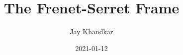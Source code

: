 \documentclass{article}
\title{The Frenet-Serret Frame}
\date{2021-01-12}
\author{Jay Khandkar}
\begin{document}
	\maketitle
	\newpage
	\tableofcontents
	\newpage
	
	\newcommand{\vect}[1]{\mathbf{#1}}
	\newcommand{\Mod}[1]{\lvert #1 \rvert}
	\newcommand{\ModFrac}[2]{\displaystyle\left\lvert \frac{#1}{#2} \right\rvert}
	\newcommand{\VectDiff}[1]{\dot{\vect{#1}}}
	\newcommand{\uveci}{{\bm{\hat{\textnormal{\bfseries\i}}}}}
    \newcommand{\uvecj}{{\bm{\hat{\textnormal{\bfseries\j}}}}}
    \newcommand{\uveck}{{\bm{\hat{\textnormal{\bfseries k}}}}}
    \newcommand*\widefbox[1]{\fbox{\hspace{2em}#1\hspace{2em}}}
    
\end{document}
